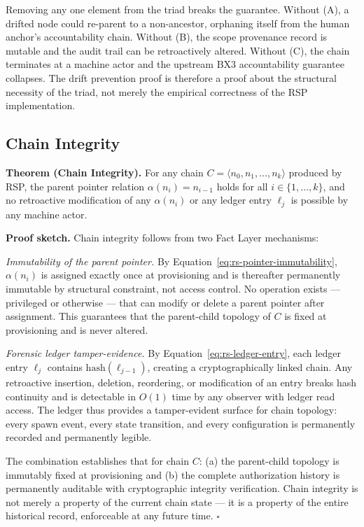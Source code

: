 Removing any one element from the triad breaks the guarantee. Without (A), a drifted node could re-parent to a non-ancestor, orphaning itself from the human anchor's accountability chain. Without (B), the scope provenance record is mutable and the audit trail can be retroactively altered. Without (C), the chain terminates at a machine actor and the upstream BX3 accountability guarantee collapses. The drift prevention proof is therefore a proof about the structural necessity of the triad, not merely the empirical correctness of the RSP implementation.

\subsection{Chain Integrity}
\label{sec:rs-chain-integrity}

\medskip
\noindent\textbf{Theorem (Chain Integrity).} For any chain $C = \langle n_0, n_1, \ldots, n_k \rangle$ produced by RSP, the parent pointer relation $\alpha(n_i) = n_{i-1}$ holds for all $i \in \{1, \ldots, k\}$, and no retroactive modification of any $\alpha(n_i)$ or any ledger entry $\ell_j$ is possible by any machine actor.

\medskip
\noindent\textbf{Proof sketch.} Chain integrity follows from two Fact Layer mechanisms:

\textit{Immutability of the parent pointer.} By Equation~\ref{eq:rs-pointer-immutability}, $\alpha(n_i)$ is assigned exactly once at provisioning and is thereafter permanently immutable by structural constraint, not access control. No operation exists — privileged or otherwise — that can modify or delete a parent pointer after assignment. This guarantees that the parent-child topology of $C$ is fixed at provisioning and is never altered.

\textit{Forensic ledger tamper-evidence.} By Equation~\ref{eq:rs-ledger-entry}, each ledger entry $\ell_j$ contains $\text{hash}(\ell_{j-1})$, creating a cryptographically linked chain. Any retroactive insertion, deletion, reordering, or modification of an entry breaks hash continuity and is detectable in $O(1)$ time by any observer with ledger read access. The ledger thus provides a tamper-evident surface for chain topology: every spawn event, every state transition, and every configuration is permanently recorded and permanently legible.

The combination establishes that for chain $C$: (a) the parent-child topology is immutably fixed at provisioning and (b) the complete authorization history is permanently auditable with cryptographic integrity verification. Chain integrity is not merely a property of the current chain state — it is a property of the entire historical record, enforceable at any future time. $\square$

